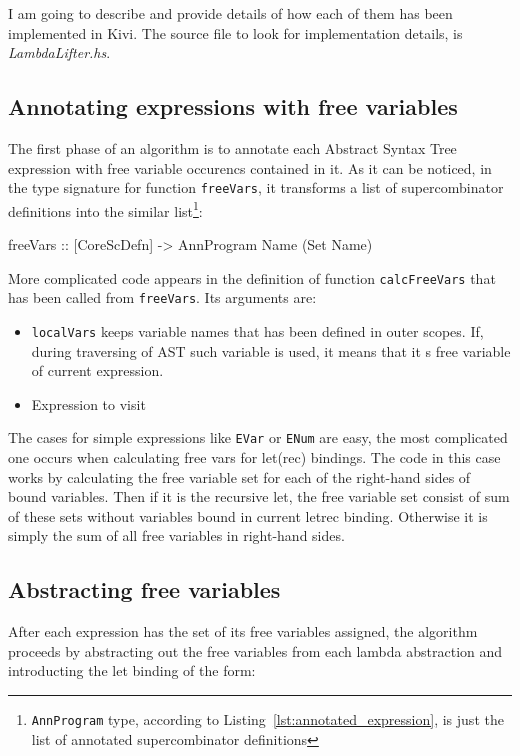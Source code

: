 \documentclass[12pt,a4paper]{report}
\begin{document}
I am going to describe and provide details of how each of them has been
implemented in Kivi. The source file to look for implementation details, is
\textit{LambdaLifter.hs}.

\subsection{Annotating expressions with free variables}
The first phase of an algorithm is to annotate each Abstract Syntax Tree
expression with free variable occurencs contained in it. As it can be noticed,
in the type signature for function \texttt{freeVars}, it transforms a list of
supercombinator definitions into the similar list\footnote{\texttt{AnnProgram}
type, according to Listing~\ref{lst:annotated_expression}, is just the list of
annotated supercombinator definitions}:

\vspace*{0.2in}
\begin{code}[style=haskell]
freeVars :: [CoreScDefn] -> AnnProgram Name (Set Name)
\end{code}

More complicated code appears in the definition of function
\texttt{calcFreeVars} that has been called from \texttt{freeVars}. Its
arguments are:
\begin{itemize}
  \item \texttt{localVars} keeps variable names that has been defined in outer
    scopes. If, during traversing of AST such variable is used, it means that
    it s free variable of current expression.
  \item Expression to visit
\end{itemize}

The cases for simple expressions like \texttt{EVar} or \texttt{ENum} are easy,
the most complicated one occurs when calculating free vars for
let(rec) bindings. The code in this case works by calculating the free
variable set for each of the right-hand sides of bound variables. Then if it is
the recursive let, the free variable set consist of sum of these sets without
variables bound in current letrec binding. Otherwise it is simply the
sum of all free variables in right-hand sides.

\subsection{Abstracting free variables}
After each expression has the set of its free variables assigned, the algorithm
proceeds by abstracting out the free variables from each lambda abstraction and
introducting the let binding of the form:
\end{document}
